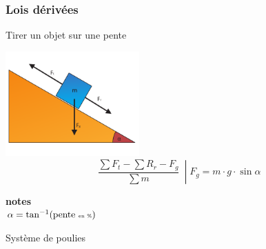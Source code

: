 \documentclass[12pt,a4paper]{article} %
\newcommand\framenote[1]{
	{\small {\bfseries notes} \\ #1}
}
\begin{document}
\subsubsection*{Lois dérivées}
Tirer un objet sur une pente \\
\begin{twocols}[0.5][0.5]
	\includegraphics[height=4cm]{Newton-Pente}
\nextcol
	\[
		\left.\frac{\sum F_t - \sum R_r - F_g}{\sum m}\:\middle|F_g = m \cdot g \cdot \sin\alpha
		\right.
	\]
	\par\vspace{0.5em}
	\framenote{$\alpha = \tan^{-1}(\text{pente {\tiny en \%}})$}
\end{twocols}
\par\vspace{1em}
Système de poulies \\
\end{document}

